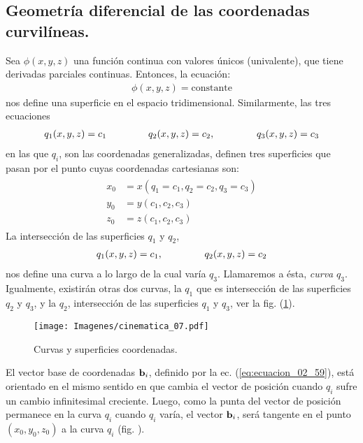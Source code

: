 \documentclass[12pt]{article}
\begin{document}
\subsection{Geometría diferencial de las coordenadas curvilíneas.}

Sea $\phi (x, y, z)$ una función continua con valores únicos (univalente), que tiene derivadas parciales continuas. Entonces, la ecuación:
\begin{align}
    \phi (x, y, z) = \text{constante}
    \label{eq:ecuacion_02_81}
\end{align} 
nos define una superficie en el espacio tridimensional. Similarmente, las tres ecuaciones 
\begin{align}
    q_{1} (x, y, z) = c_{1} \hspace{1.5cm} q_{2} (x, y, z) = c_{2}, \hspace{1.5cm} q_{3} (x, y, z) = c_{3}
    \label{eq:ecuacion_02_82}
\end{align}
en las que $q_{i}$, son las coordenadas generalizadas, definen tres superficies que pasan por el punto cuyas coordenadas cartesianas son:
\begin{align}
\begin{aligned}
x_{0} &= x \left( q_{1} = c_{1}, q_{2} = c_{2}, q_{3} = c_{3} \right) \\[0.5em]
y_{0} &= y \left( c_{1}, c_{2}, c_{3} \right) \\[0.5em]
z_{0} &= z \left( c_{1}, c_{2}, c_{3} \right)
\end{aligned}
\label{eq:ecuacion_02_83}
\end{align}
La intersección de las superficies $q_{1}$ y $q_{2}$, 
\begin{align*}
    q_{1} (x, y, z) = c_{1}, \hspace{1.5cm} q_{2} (x, y, z) = c_{2}
\end{align*}
nos define una curva a lo largo de la cual varía $q_{3}$. Llamaremos a ésta, \emph{curva} $q_{3}$. Igualmente, existirán otras dos curvas, la $q_{1}$ que es intersección de las superficies $q_{2}$ y $q_{3}$, y la $q_{2}$, intersección de las superficies $q_{1}$ y $q_{3}$, ver la fig. (\ref{fig:figura_02_07}).
\begin{figure}[H]
    \centering
    \texttt{[image: Imagenes/cinematica\_07.pdf]}
    \caption{Curvas y superficies coordenadas.}
    \label{fig:figura_02_07}
\end{figure}
El vector base de coordenadas $\vb{b}_{i}$, definido por la ec. (\ref{eq:ecuacion_02_59}), está orientado en el mismo sentido en que cambia el vector de posición cuando $q_{i}$ sufre un cambio infinitesimal creciente. Luego, como la punta del vector de posición permanece en la curva $q_{i}$ cuando $q_{i}$ varía, el vector $\vb{b}_{i}$, será tangente en el punto $(x_{0}, y_{0}, z_{0})$ a la curva $q_{i}$ (fig. ).
\end{document}
